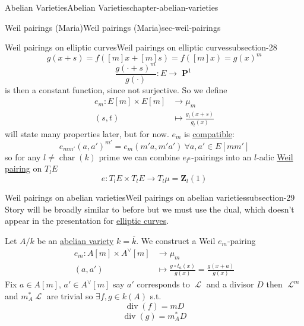 \documentclass[oneside,10pt,]{book}
\numberwithin{equation}{section}
\newcommand{\sheaf}[1]{\operatorname{\mathcal{#1}}}
\newcommand{\lb}{[}
\newcommand{\rb}{]}
\newcommand{\ZZ}{\mathbf{Z}}
\DeclareMathOperator{\divisor}{div}
\DeclareMathOperator{\characteristic}{char}
\DeclareMathOperator{\PP}{\mathbf{P}}
\newcommand{\amp}{&}
\begin{document}
\begin{chapterptx}{Abelian Varieties}{}{Abelian Varieties}{}{}{chapter-abelian-varieties}
\begin{sectionptx}{Weil pairings (Maria)}{}{Weil pairings (Maria)}{}{}{sec-weil-pairings}
\begin{subsectionptx}{Weil pairings on elliptic curves}{}{Weil pairings on elliptic curves}{}{}{subsection-28}
\begin{equation*}
g(x + s) = f([m]x + [m]s) = f([m]x) = g(x)^m
\end{equation*}
%
\begin{equation*}
\frac{g(\cdot + s)^m}{g(\cdot)} \colon E \to \PP^1
\end{equation*}
is then a constant function, since not surjective. So we define%
\begin{align*}
e_m\colon E[m]\times E[m] \amp\to \mu_m\\
(s,t)\amp \mapsto \frac{g_t(x+s)}{g_t(x)}
\end{align*}
will state many properties later, but for now. \(e_m\) is \hyperref[def-buntes-compat]{compatible}:%
\begin{equation*}
e_{mm'} (a,a')^{m'} = e_m(m'a, m'a') \ \forall a,a' \in E[mm']
\end{equation*}
so for any \(l\ne \characteristic(k)\) prime we can combine \(e_{l^n}\)-pairings into an \(l\)-adic \hyperref[prop-weil-pair]{Weil pairing} on \(T_l E\)%
\begin{equation*}
e \colon T_l E\times T_lE \to T_l \mu = \ZZ_l(1)
\end{equation*}
%
\end{subsectionptx}
%
%
\typeout{************************************************}
\typeout{************************************************}
%
\begin{subsectionptx}{Weil pairings on abelian varieties}{}{Weil pairings on abelian varieties}{}{}{subsection-29}
\hypertarget{p-300}{}%
Story will be broadly similar to before but we must use the dual, which doesn't appear in the presentation for \hyperref[def-supersing-isog-ec]{elliptic curves}.%
\par
\hypertarget{p-301}{}%
Let \(A/k\) be an \hyperref[def-buntes-abvar]{abelian variety} \(k = \overline k\). We construct a Weil \(e_m\)-pairing%
\begin{align*}
e_m \colon A[m]\times A^\vee [m] \amp\to \mu_m\\
(a,a') \amp\mapsto \frac{g\circ t_a(x)}{g(x)} = \frac{g(x+a)}{g(x)}
\end{align*}
Fix \(a\in A\lb m\rb,\,a'\in A^\vee\lb m\rb\) say \(a'\) corresponds to \(\sheaf L\) and a divisor \(D\) then \(\sheaf L^m \) and \(m_A^* \sheaf L\) are trivial so \(\exists f,g \in k(A)\) s.t.%
\begin{equation*}
\divisor (f) = m D
\end{equation*}
%
\begin{equation*}
\divisor (g) = m_A^* D

\end{equation*}
\end{subsectionptx}
\end{sectionptx}
\end{chapterptx}
\end{document}
